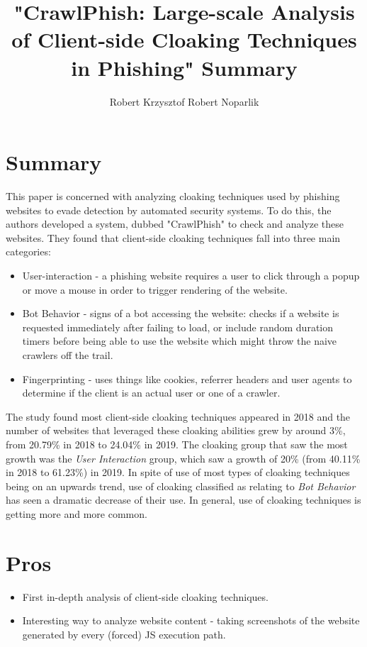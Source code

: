 \documentclass{article}
\title{"CrawlPhish: Large-scale Analysis of Client-side Cloaking Techniques in Phishing" Summary}
\author{Robert Krzysztof Robert Noparlik}
\begin{document}
\maketitle

\section{Summary}

This paper is concerned with analyzing cloaking techniques used by phishing websites to evade detection by automated security systems. To do this, the authors developed a system, dubbed "CrawlPhish" to check and analyze these websites. They found that client-side cloaking techniques fall into three main categories:

\begin{itemize}
	\item User-interaction - a phishing website requires a user to click through a popup or move a mouse in order to trigger rendering of the website.
	\item Bot Behavior - signs of a bot accessing the website: checks if a website is requested immediately after failing to load, or include random duration timers before being able to use the website which might throw the naive crawlers off the trail.
	\item Fingerprinting - uses things like cookies, referrer headers and user agents to determine if the client is an actual user or one of a crawler.
\end{itemize}

The study found most client-side cloaking techniques appeared in 2018 and the number of websites that leveraged these cloaking abilities grew by around 3\%, from 20.79\% in 2018 to 24.04\% in 2019. The cloaking group that saw the most growth was the \textit{User Interaction} group, which saw a growth of 20\% (from 40.11\% in 2018 to 61.23\%) in 2019. In spite of use of most types of cloaking techniques being on an upwards trend, use of cloaking classified as relating to \textit{Bot Behavior} has seen a dramatic decrease of their use. In general, use of cloaking techniques is getting more and more common.


\section{Pros}

\begin{itemize}
	\item First in-depth analysis of client-side cloaking techniques.
	\item Interesting way to analyze website content - taking screenshots of the website generated by every (forced) JS execution path.
\end{itemize}
\end{document}
